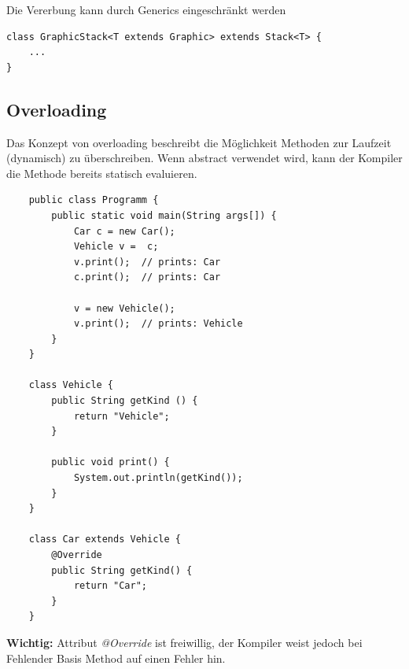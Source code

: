 Die Vererbung kann durch Generics eingeschränkt werden
\begin{lstlisting}
class GraphicStack<T extends Graphic> extends Stack<T> {
	...
}
\end{lstlisting}


\subsection{Overloading}
Das Konzept von overloading beschreibt die Möglichkeit Methoden zur Laufzeit (dynamisch) zu überschreiben. Wenn abstract verwendet wird, kann der Kompiler die Methode bereits statisch evaluieren.

\begin{lstlisting}
	public class Programm {
		public static void main(String args[]) {
			Car c = new Car();
			Vehicle v =  c;
			v.print();	// prints: Car
			c.print();  // prints: Car
			
			v = new Vehicle();
			v.print();	// prints: Vehicle
		}
	}
	
	class Vehicle {
		public String getKind () {
			return "Vehicle";
		}
		
		public void print() {
			System.out.println(getKind());
		}
	}
	
	class Car extends Vehicle {
		@Override
		public String getKind() {
			return "Car";
		}	
	}
\end{lstlisting}

\textbf{Wichtig:} Attribut \textit{@Override} ist freiwillig, der Kompiler weist jedoch bei Fehlender Basis Method auf einen Fehler hin.